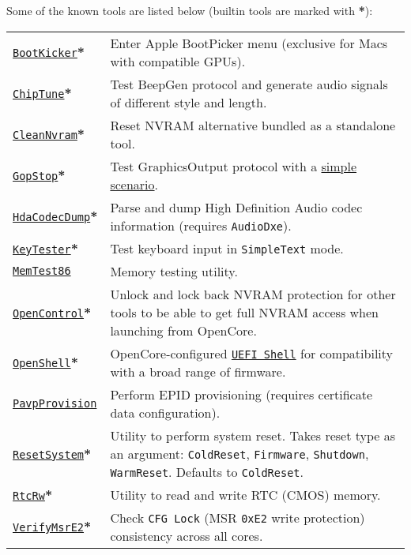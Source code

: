 \documentclass[]{article}
\begin{document}
Some of the known tools are listed below (builtin tools are marked with \textbf{*}):

\begin{tabular}{p{1.3in}p{5.55in}}
\href{https://github.com/acidanthera/OpenCorePkg}{\texttt{BootKicker}}\textbf{*}
& Enter Apple BootPicker menu (exclusive for Macs with compatible GPUs). \\
\href{https://github.com/acidanthera/OpenCorePkg}{\texttt{ChipTune}}\textbf{*}
& Test BeepGen protocol and generate audio signals of different style and length. \\
\href{https://github.com/acidanthera/OpenCorePkg}{\texttt{CleanNvram}}\textbf{*}
& Reset NVRAM alternative bundled as a standalone tool. \\
\href{https://github.com/acidanthera/OpenCorePkg}{\texttt{GopStop}}\textbf{*}
& Test GraphicsOutput protocol with a
  \href{https://github.com/acidanthera/OpenCorePkg/tree/master/Application/GopStop}{simple scenario}. \\
\href{https://github.com/acidanthera/OpenCorePkg}{\texttt{HdaCodecDump}}\textbf{*}
& Parse and dump High Definition Audio codec information (requires \texttt{AudioDxe}). \\
\href{https://github.com/acidanthera/OpenCorePkg}{\texttt{KeyTester}}\textbf{*}
& Test keyboard input in \texttt{SimpleText} mode. \\
\href{https://www.memtest86.com}{\texttt{MemTest86}}
& Memory testing utility. \\
\href{https://github.com/acidanthera/OpenCorePkg}{\texttt{OpenControl}}\textbf{*}
& Unlock and lock back NVRAM protection for other tools to be able to get full NVRAM access
  when launching from OpenCore. \\
\href{https://github.com/acidanthera/OpenCorePkg}{\texttt{OpenShell}}\textbf{*}
& OpenCore-configured \href{http://github.com/tianocore/edk2}{\texttt{UEFI Shell}} for compatibility
  with a broad range of firmware. \\
\href{https://github.com/acidanthera/OpenCorePkg}{\texttt{PavpProvision}}
& Perform EPID provisioning (requires certificate data configuration). \\
\href{https://github.com/acidanthera/OpenCorePkg}{\texttt{ResetSystem}}\textbf{*}
& Utility to perform system reset. Takes reset type as an argument:
  \texttt{ColdReset}, \texttt{Firmware}, \texttt{Shutdown}, \texttt{WarmReset}.
  Defaults to \texttt{ColdReset}. \\
\href{https://github.com/acidanthera/OpenCorePkg}{\texttt{RtcRw}}\textbf{*}
& Utility to read and write RTC (CMOS) memory. \\
\href{https://github.com/acidanthera/OpenCorePkg}{\texttt{VerifyMsrE2}}\textbf{*}
& Check \texttt{CFG Lock} (MSR \texttt{0xE2} write protection) consistency across all cores.
\end{tabular}
\end{document}
